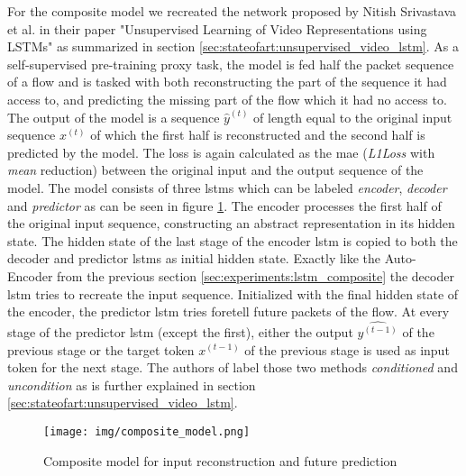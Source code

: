 For the composite model we recreated the network proposed by Nitish Srivastava et al. in their paper "Unsupervised Learning of Video Representations using LSTMs" \cite{unsupervised_learning_lstms} as summarized in section \ref{sec:stateofart:unsupervised_video_lstm}. As a self-supervised pre-training proxy task, the model is fed half the packet sequence of a flow and is tasked with both reconstructing the part of the sequence it had access to, and predicting the missing part of the flow which it had no access to. The output of the model is a sequence $\hat{y}^{(t)}$ of length equal to the original input sequence $x^{(t)}$ of which the first half is reconstructed and the second half is predicted by the model. The loss is again calculated as the \gls{mae} (\textit{L1Loss} with \textit{mean} reduction) between the original input and the output sequence of the model. The model consists of three \glspl{lstm} which can be labeled \textit{encoder}, \textit{decoder} and \textit{predictor} as can be seen in figure \ref{fig:experiments:unsupervised_lstm_composite}. The encoder processes the first half of the original input sequence, constructing an abstract representation in its hidden state. The hidden state of the last stage of the encoder \gls{lstm} is copied to both the decoder and predictor \glspl{lstm} as initial hidden state. Exactly like the Auto-Encoder from the previous section \ref{sec:experiments:lstm_composite} the decoder \gls{lstm} tries to recreate the input sequence. Initialized with the final hidden state of the encoder, the predictor \gls{lstm} tries foretell future packets of the flow. At every stage of the predictor \gls{lstm} (except the first), either the output $\hat{y^{(t-1)}}$ of the previous stage or the target token $x^{(t-1)}$ of the previous stage is used as input token for the next stage. The authors of \cite{unsupervised_learning_lstms} label those two methods \textit{conditioned} and \textit{uncondition} as is further explained in section \ref{sec:stateofart:unsupervised_video_lstm}.


\begin{figure}[h]
	\centering
	\texttt{[image: img/composite\_model.png]}
	\caption{Composite model for input reconstruction and future prediction}
	\label{fig:experiments:unsupervised_lstm_composite}
\end{figure}	


